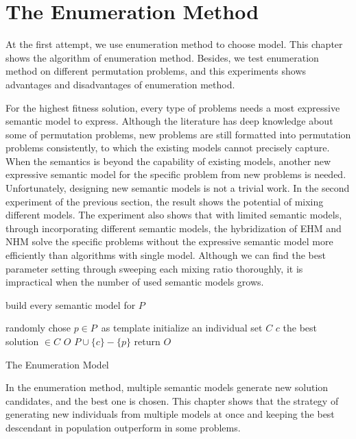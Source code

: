 \section{The Enumeration Method}

At the first attempt, we use enumeration method to choose model. This chapter shows the algorithm of enumeration method. Besides, we test enumeration method on different permutation problems, and this experiments shows advantages and disadvantages of enumeration method.

For the highest fitness solution, every type of problems needs a most expressive semantic model to express. Although the literature has deep knowledge about some of permutation problems, new problems are still formatted into permutation problems consistently, to which the existing models cannot precisely capture. When the semantics is beyond the capability of existing models, another new expressive  semantic model for the specific problem from new problems is needed. Unfortunately, designing new semantic models is not a trivial work. In the second experiment of the previous section, the result shows the potential of mixing different models. The experiment also shows that with limited semantic models, through incorporating different semantic models, the hybridization of EHM and NHM solve the specific problems without the expressive semantic model more efficiently than algorithms with single model. Although we can find the best parameter setting through sweeping each mixing ratio thoroughly, it is impractical when the number of used semantic models grows.


{\LinesNumbered
\begin{algorithm}[htbp]

        build every semantic model for $P$\;
        
        randomly chose $p \in P$\ as template\; 
        initialize an individual set $C$ \;
        $c$ \leftarrow the best solution $\in C$\;
        $O$ \leftarrow $P \cup \{c\} - \{p\}$\;
        return $O$\;
    \caption{The Enumeration Model}
    \label{alg:enumeration_method}
\end{algorithm}}

In the enumeration method, multiple semantic models generate new solution candidates, and the best one is chosen. This chapter shows that the strategy of generating new individuals from multiple models at once and keeping the best descendant in population outperform in some problems. 

